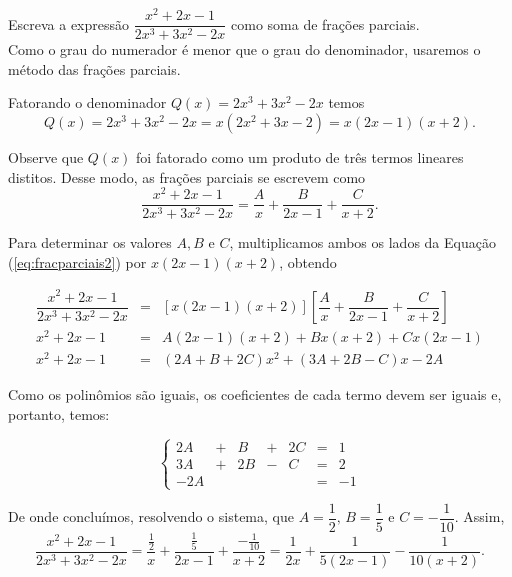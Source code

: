 \begin{exem}
    Escreva a expressão $\dfrac{x^2 + 2x - 1}{2x^3 + 3x^2 - 2x}$ como soma de frações parciais. \\[10pt]

    Como o grau do numerador é menor que o grau do denominador, usaremos o método das frações parciais.

    Fatorando o denominador $Q(x) = 2x^3 + 3x^2 - 2x$ temos $$Q(x) = 2x^3 + 3x^2 - 2x = x(2x^2 + 3x - 2) = x(2x-1)(x+2).$$

    Observe que $Q(x)$ foi fatorado como um produto de três termos lineares distitos. Desse modo, as frações parciais se escrevem como 
    \begin{equation}
    \label{eq:fracparciais2}
    \dfrac{x^2 + 2x - 1}{2x^3 + 3x^2 - 2x} = \dfrac{A}{x} + \dfrac{B}{2x-1} + \dfrac{C}{x+2}.
    \end{equation}

    Para determinar os valores $A, B$ e $C$, multiplicamos ambos os lados da Equação (\ref{eq:fracparciais2}) por $x(2x-1)(x+2)$, obtendo

    \begin{eqnarray*}
    [x(2x-1)(x+2)]\dfrac{x^2 + 2x - 1}{2x^3 + 3x^2 - 2x} & = & [x(2x-1)(x+2)] \left[\dfrac{A}{x} + \dfrac{B}{2x-1}+\dfrac{C}{x+2}\right]\\[5pt]
    x^2 + 2x - 1 & =& A(2x-1)(x+2) + Bx(x+2) + Cx(2x-1) \\[5pt]
    x^2 + 2x - 1 & =& (2A + B + 2C)x^2 + (3A + 2B - C)x -2A
    \end{eqnarray*}

    Como os polinômios são iguais, os coeficientes de cada termo devem ser iguais e, portanto, temos:

    \begin{equation*}
    \left\{ \begin{array}{ccccccc} 2A & + & B & + & 2C &=& 1 \\[5pt]
    3A & + & 2B & - & C &=& 2\\[5pt]
    -2A &  &  & &  &=& -1
    \end{array}
    \right.    
    \end{equation*}

    De onde concluímos, resolvendo o sistema, que $A = \dfrac{1}{2}, \, B = \dfrac{1}{5}$ e $C = -\dfrac{1}{10}$. Assim, $$\dfrac{x^2 + 2x - 1}{2x^3 + 3x^2 - 2x} = \dfrac{\frac{1}{2}}{x} + \dfrac{\frac{1}{5}}{2x-1}+\dfrac{-\frac{1}{10}}{x+2} = \dfrac{1}{2x} + \dfrac{1}{5(2x-1)} - \dfrac{1}{10(x+2)}.$$
 
\end{exem}


